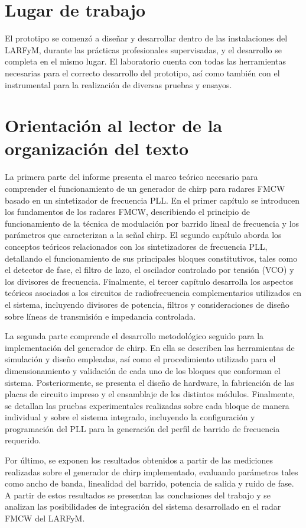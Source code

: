 \section{Lugar de trabajo}
El prototipo se comenzó a diseñar y desarrollar dentro de las instalaciones del LARFyM, durante las prácticas profesionales supervisadas, y el desarrollo se completa en el mismo lugar. El laboratorio cuenta con todas las herramientas necesarias para el correcto desarrollo del prototipo, así como también con el instrumental para la realización de diversas pruebas y ensayos.

\section{Orientación al lector de la organización del texto}
La primera parte del informe presenta el marco teórico necesario para comprender el funcionamiento de un generador de chirp para radares FMCW basado en un sintetizador de frecuencia PLL. En el primer capítulo se introducen los fundamentos de los radares FMCW, describiendo el principio de funcionamiento de la técnica de modulación por barrido lineal de frecuencia y los parámetros que caracterizan a la señal chirp. El segundo capítulo aborda los conceptos teóricos relacionados con los sintetizadores de frecuencia PLL, detallando el funcionamiento de sus principales bloques constitutivos, tales como el detector de fase, el filtro de lazo, el oscilador controlado por tensión (VCO) y los divisores de frecuencia. Finalmente, el tercer capítulo desarrolla los aspectos teóricos asociados a los circuitos de radiofrecuencia complementarios utilizados en el sistema, incluyendo divisores de potencia, filtros y consideraciones de diseño sobre líneas de transmisión e impedancia controlada.

La segunda parte comprende el desarrollo metodológico seguido para la implementación del generador de chirp. En ella se describen las herramientas de simulación y diseño empleadas, así como el procedimiento utilizado para el dimensionamiento y validación de cada uno de los bloques que conforman el sistema. Posteriormente, se presenta el diseño de hardware, la fabricación de las placas de circuito impreso y el ensamblaje de los distintos módulos. Finalmente, se detallan las pruebas experimentales realizadas sobre cada bloque de manera individual y sobre el sistema integrado, incluyendo la configuración y programación del PLL para la generación del perfil de barrido de frecuencia requerido.

Por último, se exponen los resultados obtenidos a partir de las mediciones realizadas sobre el generador de chirp implementado, evaluando parámetros tales como ancho de banda, linealidad del barrido, potencia de salida y ruido de fase. A partir de estos resultados se presentan las conclusiones del trabajo y se analizan las posibilidades de integración del sistema desarrollado en el radar FMCW del LARFyM.